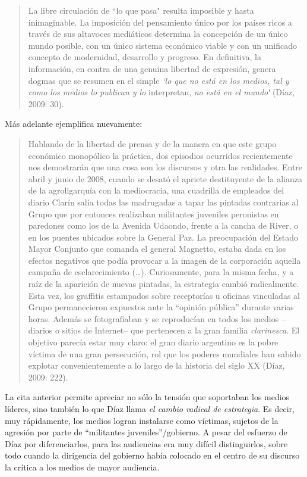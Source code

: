 {\begin{quote}
La libre circulación de ``lo que pasa" resulta imposible y hasta inimaginable. La imposición del pensamiento único por los países ricos a través de sus altavoces mediáticos determina la concepción de un único mundo posible, con un único sistema económico viable y con un unificado concepto de modernidad, desarrollo y progreso. En definitiva, la información, en contra de una genuina libertad de expresión, genera dogmas que se resumen en el simple \emph{`lo que no está en los medios, tal y como los medios lo publican y lo} interpretan, \emph{no está en el mundoʹ} (Díaz, 2009: 30).
\end{quote}

Más adelante ejemplifica nuevamente:

\begin{quote}
Hablando de la libertad de prensa y de la manera en que este grupo económico monopólico la práctica, dos episodios ocurridos recientemente nos demostrarán que una cosa son los discursos y otra las realidades. Entre abril y junio de 2008, cuando se desató el apriete destituyente de la alianza de la agroligarquía con la mediocracia, una cuadrilla de empleados del diario Clarín salía todas las madrugadas a tapar las pintadas contrarias al Grupo que por entonces realizaban militantes juveniles peronistas en paredones como los de la Avenida Udaondo, frente a la cancha de River, o en los puentes ubicados sobre la General Paz. La preocupación del Estado Mayor Conjunto que comanda el general Magnetto, estaba dada en los efectos negativos que podía provocar a la imagen de la corporación aquella campaña de esclarecimiento (\ldots). Curiosamente, para la misma fecha, y a raíz de la aparición de nuevas pintadas, la estrategia cambió radicalmente. Esta vez, los graffitis estampados sobre receptorías u oficinas vinculadas al Grupo permanecieron expuestos ante la ``opinión pública'' durante varias horas. Además se fotografiaban y se reproducían en todos los medios --diarios o sitios de Internet-- que pertenecen a la gran familia \emph{clarinesca}. El objetivo parecía estar muy claro: el gran diario argentino es la pobre víctima de una gran persecución, rol que los poderes mundiales han sabido explotar convenientemente a lo largo de la historia del siglo XX (Díaz, 2009: 222).
\end{quote}

La cita anterior permite apreciar no sólo la tensión que soportaban los medios líderes, sino también lo que Díaz llama \emph{el cambio radical de estrategia}. Es decir, muy rápidamente, los medios logran instalarse como víctimas, sujetos de la agresión por parte de ``militantes juveniles''/gobierno. A pesar del esfuerzo de Díaz por diferenciarlos, para las audiencias era muy difícil distinguirlos, sobre todo cuando la dirigencia del gobierno había colocado en el centro de su discurso la crítica a los medios de mayor audiencia.

}
